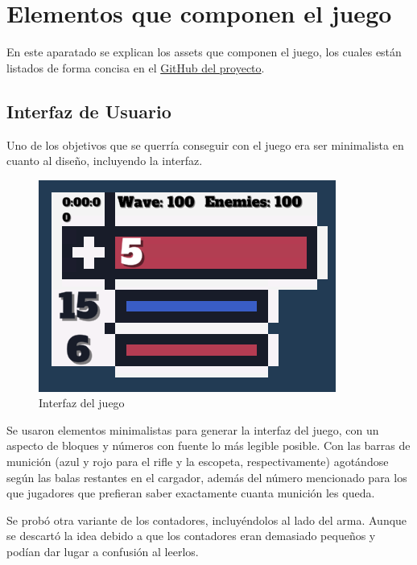 \documentclass[12pt]{article}
\begin{document}
\section{Elementos que componen el juego}
    En este aparatado se explican los assets que componen el juego, los cuales están listados de forma concisa en el \href{https://github.com/JesusJMUJI/TopDownShooterGame}{GitHub del proyecto}. 
    
    \subsection{Interfaz de Usuario}
        Uno de los objetivos que se querría conseguir con el juego era ser minimalista en cuanto al diseño, incluyendo la interfaz.  
        \begin{figure}[H]
            \centering
            \includegraphics[scale = 0.7]{Images/UI.png}
            \caption{Interfaz del juego}
            \label{fig:UI}
        \end{figure}
        
        Se usaron elementos minimalistas para generar la interfaz del juego, con un aspecto de bloques y números con fuente lo más legible posible. Con las barras de munición (azul y rojo para el rifle y la escopeta, respectivamente) agotándose según las balas restantes en el cargador, además del número mencionado para los que jugadores que prefieran saber exactamente cuanta munición les queda.
        
        Se probó otra variante de los contadores, incluyéndolos al lado del arma. Aunque se descartó la idea debido a que los contadores eran demasiado pequeños y podían dar lugar a confusión al leerlos.
        
\end{document}
